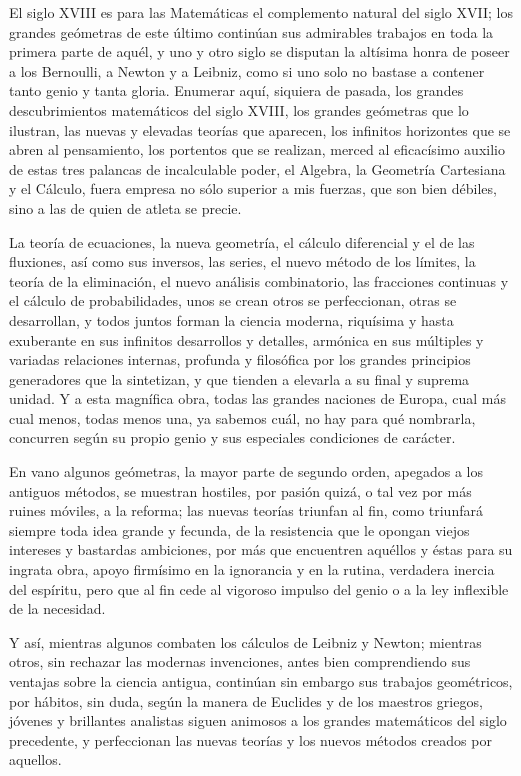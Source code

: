\documentclass[a4paper, 12pt]{article}
\begin{document}
{{{{El siglo XVIII es para las Matemáticas el complemento natural del siglo XVII; los grandes geómetras de este último continúan sus admirables trabajos en toda la primera parte de aquél, y uno y otro siglo se disputan la altísima honra de poseer a los Bernoulli, a Newton y a Leibniz, como si uno solo no bastase a contener tanto genio y tanta gloria.  Enumerar aquí, siquiera de pasada, los grandes descubrimientos matemáticos del siglo XVIII, los grandes geómetras que lo ilustran, las nuevas y elevadas teorías que aparecen, los infinitos horizontes que se abren al pensamiento, los portentos que se realizan, merced al eficacísimo auxilio de estas tres palancas de incalculable poder, el Algebra, la Geometría Cartesiana y el Cálculo, fuera empresa no sólo superior a mis fuerzas, que son bien débiles, sino a las de quien de atleta se precie.

La teoría de ecuaciones, la nueva geometría, el cálculo diferencial y el de las fluxiones, así como sus inversos, las series, el nuevo método de los límites, la teoría de la eliminación, el nuevo análisis combinatorio, las fracciones continuas y el cálculo de probabilidades, unos se crean otros se perfeccionan, otras se desarrollan, y todos juntos forman la ciencia moderna, riquísima y hasta exuberante en sus infinitos desarrollos y detalles, armónica en sus múltiples y variadas relaciones internas, profunda y filosófica por los grandes principios generadores que la sintetizan, y que tienden a elevarla a su final y suprema unidad.  Y a esta magnífica obra, todas las grandes naciones de Europa, cual más cual menos, todas menos una, ya sabemos cuál, no hay para qué nombrarla, concurren según su propio genio y sus especiales condiciones de carácter.

En vano algunos geómetras, la mayor parte de segundo orden, apegados a los antiguos métodos, se muestran hostiles, por pasión quizá, o tal vez por más ruines móviles, a la reforma; las nuevas teorías triunfan al fin, como triunfará siempre toda idea grande y fecunda, de la resistencia que le opongan viejos intereses y bastardas ambiciones, por más que encuentren aquéllos y éstas para su ingrata obra, apoyo firmísimo en la ignorancia y en la rutina, verdadera inercia del espíritu, pero que al fin cede al vigoroso impulso del genio o a la ley inflexible de la necesidad.

Y así, mientras algunos combaten los cálculos de Leibniz y Newton; mientras otros, sin rechazar las modernas invenciones, antes bien comprendiendo sus ventajas sobre la ciencia antigua, continúan sin embargo sus trabajos geométricos, por hábitos, sin duda, según la manera de Euclides y de los maestros griegos, jóvenes y brillantes analistas siguen animosos a los grandes matemáticos del siglo precedente, y perfeccionan las nuevas teorías y los nuevos métodos creados por aquellos.

}}}}
\end{document}
